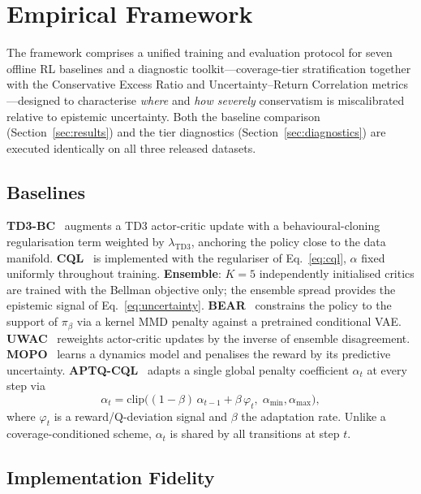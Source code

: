 \documentclass[conference]{IEEEtran}
\begin{document}
\section{Empirical Framework}
\label{sec:method}

The framework comprises a unified training and evaluation protocol for
seven offline RL baselines and a diagnostic toolkit---coverage-tier
stratification together with the Conservative Excess Ratio and
Uncertainty--Return Correlation metrics---designed to characterise
\emph{where} and \emph{how severely} conservatism is miscalibrated relative
to epistemic uncertainty. Both the baseline comparison
(Section~\ref{sec:results}) and the tier diagnostics
(Section~\ref{sec:diagnostics}) are executed identically on all three
released datasets.

\subsection{Baselines}

\textbf{TD3-BC}~\cite{fujimoto2021td3bc} augments a TD3 actor-critic update
with a behavioural-cloning regularisation term weighted by
$\lambda_{\mathrm{TD3}}$, anchoring the policy close to the data manifold.
\textbf{CQL}~\cite{kumar2020conservative} is implemented with the
regulariser of Eq.~\eqref{eq:cql}, $\alpha$ fixed uniformly throughout
training. \textbf{Ensemble}: $K{=}5$ independently initialised critics are
trained with the Bellman objective only; the ensemble spread provides the
epistemic signal of Eq.~\eqref{eq:uncertainty}. \textbf{BEAR}~\cite{kumar2019bear}
constrains the policy to the support of $\pi_\beta$ via a kernel MMD penalty
against a pretrained conditional VAE. \textbf{UWAC}~\cite{wu2021uncertainty}
reweights actor-critic updates by the inverse of ensemble disagreement.
\textbf{MOPO}~\cite{yu2020mopo} learns a dynamics model and penalises the
reward by its predictive uncertainty. \textbf{APTQ-CQL}~\cite{liu2023aptq}
adapts a single global penalty coefficient $\alpha_t$ at every step via
\begin{equation}
  \alpha_t = \mathrm{clip}\!\bigl((1-\beta)\,\alpha_{t-1}
             + \beta\,\varphi_t,\;
             \alpha_{\min},\alpha_{\max}\bigr),
  \label{eq:aptq}
\end{equation}
where $\varphi_t$ is a reward/Q-deviation signal and $\beta$ the adaptation
rate. Unlike a coverage-conditioned scheme, $\alpha_t$ is shared by all
transitions at step $t$.

\subsection{Implementation Fidelity}
\end{document}
